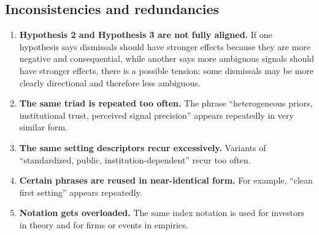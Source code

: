 \documentclass[12pt]{article}
\begin{document}
\subsection*{Inconsistencies and redundancies}
\begin{enumerate}[label=\textbf{\arabic*.}, leftmargin=1.75em]
    \item \textbf{Hypothesis 2 and Hypothesis 3 are not fully aligned.} If one hypothesis says dismissals should have stronger effects because they are more negative and consequential, while another says more ambiguous signals should have stronger effects, there is a possible tension: some dismissals may be more clearly directional and therefore less ambiguous.
    \item \textbf{The same triad is repeated too often.} The phrase ``heterogeneous priors, institutional trust, perceived signal precision'' appears repeatedly in very similar form.
    \item \textbf{The same setting descriptors recur excessively.} Variants of ``standardized, public, institution-dependent'' recur too often.
    \item \textbf{Certain phrases are reused in near-identical form.} For example, ``clean first setting'' appears repeatedly.
    \item \textbf{Notation gets overloaded.} The same index notation is used for investors in theory and for firms or events in empirics.
\end{enumerate}
\end{document}
